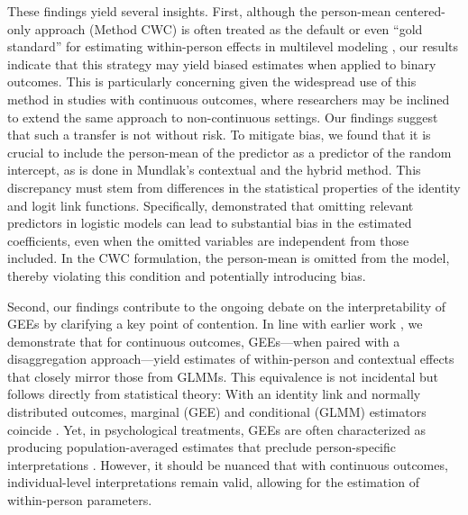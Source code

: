 \documentclass[stu]{apa7}
\begin{document}

These findings yield several insights. First, although the person-mean centered-only approach (Method CWC) is often treated as the default or even “gold standard” for estimating within-person effects in multilevel modeling \parencite[e.g.,][]{hamaker_fixed_2020, enders_centering_2007, raudenbush_adaptive_2009}, our results indicate that this strategy may yield biased estimates when applied to binary outcomes. This is particularly concerning given the widespread use of this method in studies with continuous outcomes, where researchers may be inclined to extend the same approach to non-continuous settings. Our findings suggest that such a transfer is not without risk. To mitigate bias, we found that it is crucial to include the person-mean of the predictor as a predictor of the random intercept, as is done in Mundlak's contextual and the hybrid method. This discrepancy must stem from differences in the statistical properties of the identity and logit link functions. Specifically, \textcite[p. 807]{neuhaus_geometric_1993} demonstrated that omitting relevant predictors in logistic models can lead to substantial bias in the estimated coefficients, even when the omitted variables are independent from those included. In the CWC formulation, the person-mean is omitted from the model, thereby violating this condition and potentially introducing bias.


Second, our findings contribute to the ongoing debate on the interpretability of GEEs by clarifying a key point of contention. In line with earlier work \parencite{begg_separation_2003}, we demonstrate that for continuous outcomes, GEEs—when paired with a disaggregation approach—yield estimates of within-person and contextual effects that closely mirror those from GLMMs. This equivalence is not incidental but follows directly from statistical theory: With an identity link and normally distributed outcomes, marginal (GEE) and conditional (GLMM) estimators coincide \parencite{zeger_models_1988, neuhaus_comparison_1991}. Yet, in psychological treatments, GEEs are often characterized as producing population-averaged estimates that preclude person-specific interpretations \parencite[e.g.,][]{mcneish_unnecessary_2017, ballinger_using_2004, bauer_fitting_2011}. However, it should be nuanced that with continuous outcomes, individual-level interpretations remain valid, allowing for the estimation of within-person parameters. 
\end{document}
